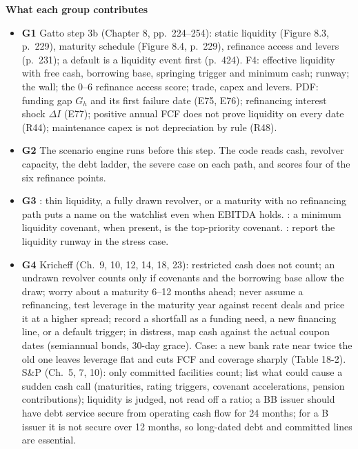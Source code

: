 \documentclass[11pt]{article}
\newcommand{\GA}{\textcolor{gA}{\textbf{G1}}}
\newcommand{\GB}{\textcolor{gB}{\textbf{G2}}}
\newcommand{\GC}{\textcolor{gC}{\textbf{G3}}}
\newcommand{\GD}{\textcolor{gD}{\textbf{G4}}}
\newcommand{\fld}[1]{\par\medskip\noindent\textbf{\textcolor{steel}{#1}}\par\nopagebreak}
\begin{document}
\fld{What each group contributes}
\begin{itemize}
\item \GA{} Gatto step 3b (Chapter 8, pp.~224--254): static liquidity (Figure 8.3, p.~229), maturity schedule (Figure 8.4, p.~229), refinance access and levers (p.~231); a default is a liquidity event first (p.~424). F4: effective liquidity with free cash, borrowing base, springing trigger and minimum cash; runway; the wall; the 0--6 refinance access score; trade, capex and levers. PDF: funding gap $G_h$ and its first failure date (E75, E76); refinancing interest shock $\Delta I$ (E77); positive annual FCF does not prove liquidity on every date (R44); maintenance capex is not depreciation by rule (R48).
\item \GB{} The scenario engine runs before this step. The code reads cash, revolver capacity, the debt ladder, the severe case on each path, and scores four of the six refinance points.
\item \GC{} : thin liquidity, a fully drawn revolver, or a maturity with no refinancing path puts a name on the watchlist even when EBITDA holds. : a minimum liquidity covenant, when present, is the top-priority covenant. : report the liquidity runway in the stress case.
\item \GD{} Kricheff (Ch.~9, 10, 12, 14, 18, 23): restricted cash does not count; an undrawn revolver counts only if covenants and the borrowing base allow the draw; worry about a maturity 6--12 months ahead; never assume a refinancing, test leverage in the maturity year against recent deals and price it at a higher spread; record a shortfall as a funding need, a new financing line, or a default trigger; in distress, map cash against the actual coupon dates (semiannual bonds, 30-day grace). Case: a new bank rate near twice the old one leaves leverage flat and cuts FCF and coverage sharply (Table 18-2). S\&P (Ch.~5, 7, 10): only committed facilities count; list what could cause a sudden cash call (maturities, rating triggers, covenant accelerations, pension contributions); liquidity is judged, not read off a ratio; a BB issuer should have debt service secure from operating cash flow for 24 months; for a B issuer it is not secure over 12 months, so long-dated debt and committed lines are essential.
\end{itemize}
\end{document}
